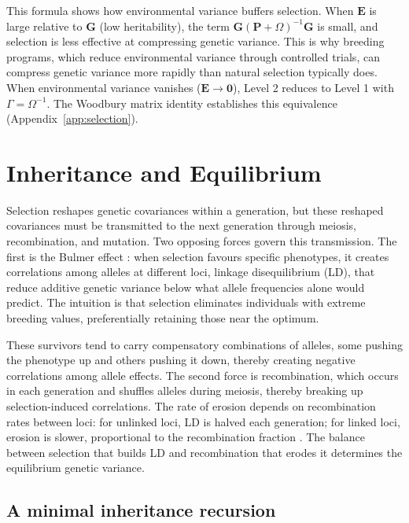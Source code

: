 \documentclass[9pt,twocolumn,twoside,lineno]{gsajnl}
\newcommand{\mat}[1]{\mathbf{#1}}
\begin{document}
This formula shows how environmental variance buffers selection. When $\mat{E}$ is large relative to $\mat{G}$ (low heritability), the term $\mat{G}(\mat{P} + \Omega)^{-1}\mat{G}$ is small, and selection is less effective at compressing genetic variance. This is why breeding programs, which reduce environmental variance through controlled trials, can compress genetic variance more rapidly than natural selection typically does. When environmental variance vanishes ($\mat{E} \to \mat{0}$), Level 2 reduces to Level 1 with $\Gamma = \Omega^{-1}$. The Woodbury matrix identity establishes this equivalence (Appendix~\ref{app:selection}).


\section{Inheritance and Equilibrium}
\label{sec:inheritance}

Selection reshapes genetic covariances within a generation, but these reshaped covariances must be transmitted to the next generation through meiosis, recombination, and mutation. Two opposing forces govern this transmission. The first is the Bulmer effect \citep{Bulmer1971}: when selection favours specific phenotypes, it creates correlations among alleles at different loci, linkage disequilibrium (LD), that reduce additive genetic variance below what allele frequencies alone would predict. The intuition is that selection eliminates individuals with extreme breeding values, preferentially retaining those near the optimum. 

These survivors tend to carry compensatory combinations of alleles, some pushing the phenotype up and others pushing it down, thereby creating negative correlations among allele effects. The second force is recombination, which occurs in each generation and shuffles alleles during meiosis, thereby breaking up selection-induced correlations. The rate of erosion depends on recombination rates between loci: for unlinked loci, LD is halved each generation; for linked loci, erosion is slower, proportional to the recombination fraction \citep{Walsh2018}. The balance between selection that builds LD and recombination that erodes it determines the equilibrium genetic variance.

\subsection{A minimal inheritance recursion}
\end{document}
